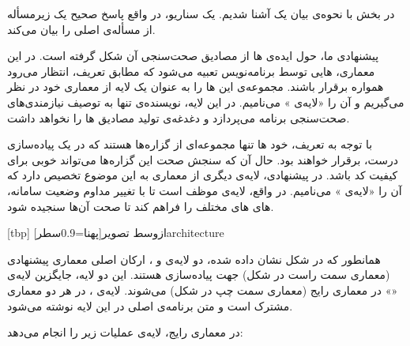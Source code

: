 در بخش  با نحوه‌ی بیان یک  آشنا شدیم. یک سناریو، در واقع پاسخ صحیح یک زیرمسأله از مسأله‌ی اصلی را بیان می‌کند.

 پیشنهادی ما، حول ایده‌ی  ‌ها از مصادیق صحت‌سنجی آن شکل گرفته است. در این معماری، ‌هایی توسط برنامه‌نویس تعبیه می‌شود که مطابق تعریف، انتظار می‌رود همواره برقرار باشند. مجموعه‌ی این ‌ها را به عنوان یک لایه از معماری   خود در نظر می‌گیریم و آن را «لایه‌ی » می‌نامیم. در این لایه، نویسنده‌ی  تنها به توصیف نیازمندی‌های صحت‌سنجی برنامه می‌پردازد و دغدغه‌ی تولید مصادیق ‌ها را نخواهد داشت.

با توجه به تعریف، خود ‌ها تنها مجموعه‌ای از گزاره‌ها هستند که در یک پیاده‌سازی درست، برقرار خواهند بود. حال آن که سنجش صحت این گزاره‌ها می‌تواند  خوبی برای کیفیت کد باشد. در  پیشنهادی، لایه‌ی دیگری از معماری  به این موضوع تخصیص دارد که آن را «لایه‌ی » می‌نامیم. در واقع، لایه‌ی  موظف است تا با تغییر مداوم وضعیت سامانه، ‌های ‌های مختلف را فراهم کند تا صحت آن‌ها سنجیده شود.

[tbp]
‌ازوسط
‌تصویر[پهنا=0.9‌سطر]{architecture}

همانطور که در شکل  نشان داده شده، دو لایه‌ی
 و ، ارکان اصلی معماری پیشنهادی (معماری سمت
راست در شکل) جهت پیاده‌سازی   هستند. این دو
لایه، جایگزین لایه‌ی «» در معماری رایج (معماری سمت چپ در
شکل) می‌شوند. لایه‌ی ، در هر دو معماری مشترک
است و متن برنامه‌ی اصلی در این لایه نوشته می‌شود.

در معماری رایج، لایه‌ی  عملیات زیر را انجام می‌دهد:




